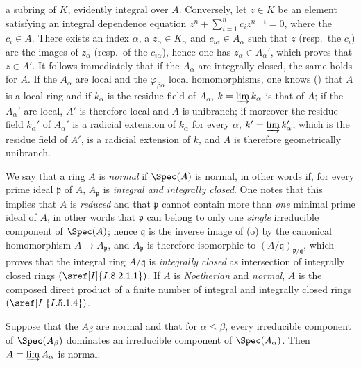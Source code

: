 
a subring of $K$, evidently integral over $A$.
Conversely, let $z\in K$ be an element satisfying an integral dependence equation $z^n+\sum_{i=1}^n c_i z^{n-i}=0$, where the $c_i\in A$.
There exists an index $\alpha$, a $z_\alpha\in K_\alpha$ and $c_{i\alpha}\in A_\alpha$ such that $z$ (resp.\ the $c_i$) are the images of $z_\alpha$ (resp.\ of the $c_{i\alpha}$), hence one has $z_\alpha\in A_\alpha'$, which proves that $z\in A'$.
It follows immediately that if the $A_\alpha$ are integrally closed, the same holds for $A$.
If the $A_\alpha$ are local and the $\varphi_{\beta\alpha}$ local homomorphisms, one knows () that $A$ is a local ring and if $k_\alpha$ is the residue field of $A_\alpha$, $k=\varinjlim k_\alpha$ is that of $A$; if the $A_\alpha'$ are local, $A'$ is therefore local and $A$ is unibranch; if moreover the residue field $k_\alpha'$ of $A_\alpha'$ is a radicial extension of $k_\alpha$ for every $\alpha$, $k'=\varinjlim k_\alpha'$, which is the residue field of $A'$, is a radicial extension of $k$, and $A$ is therefore geometrically unibranch.

\begin{env}[5.13.5]
\label{IV.5.13.5}
We say that a ring $A$ is \emph{normal} if $\Spec(A)$ is normal, in other words if, for every prime ideal $\mathfrak{p}$ of $A$, $A_\mathfrak{p}$ is \emph{integral and integrally closed}.
One notes that this implies that $A$ is \emph{reduced} and that $\mathfrak{p}$ cannot contain more than \emph{one} minimal prime ideal of $A$, in other words that $\mathfrak{p}$ can belong to only one \emph{single} irreducible component of $\Spec(A)$; hence $\mathfrak{q}$ is the inverse image of (o) by the canonical homomorphism $A\to A_\mathfrak{p}$, and $A_\mathfrak{p}$ is therefore isomorphic to $(A/\mathfrak{q})_{\mathfrak{p}/\mathfrak{q}}$, which proves that the integral ring $A/\mathfrak{q}$ is \emph{integrally closed} as intersection of integrally closed rings $(\sref[I]{I.8.2.1.1})$.
If $A$ is \emph{Noetherian} and \emph{normal}, $A$ is the composed direct product of a finite number of integral and integrally closed rings $(\sref[I]{I.5.1.4})$.
\end{env}

\begin{corollary}[5.13.6]
\label{IV.5.13.6}
Suppose that the $A_\beta$ are normal and that for $\alpha\leqslant\beta$, every irreducible component of $\Spec(A_\beta)$ dominates an irreducible component of $\Spec(A_\alpha)$.
Then $A=\varinjlim A_\alpha$ is normal.
\end{corollary}


